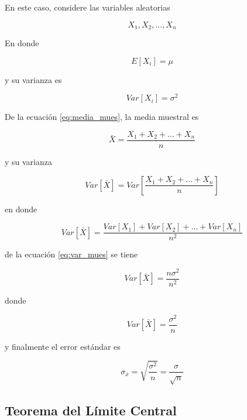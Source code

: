 \documentclass[
  oneside]{book}
\begin{document}
En este caso, considere las variables aleatorias

\begin{equation}
X_1,X_2,...,X_n
\label{eq:va}
\end{equation}

En donde

\begin{equation}
E[X_i]=\mu
\label{eq:esp}
\end{equation}

y su varianza es

\begin{equation}
Var[X_i]=\sigma^2
\label{eq:var}
\end{equation}

De la ecuación \eqref{eq:media_mues}, la media muestral es

\begin{equation}
\bar{X}=\frac{X_1+X_2+\dots+X_n}{n}
\label{eq:media_va}
\end{equation}

y su varianza

\begin{equation}
Var[\bar{X}]=Var\left[\frac{X_1+X_2+\dots+X_n}{n}\right]
\label{eq:var_mues}
\end{equation}

en donde

\begin{equation}
Var[\bar{X}]=\frac{Var[X_1]+Var[X_2]+\dots+Var[X_n]}{n^2}
\label{eq:var_mues2}
\end{equation}

de la ecuación \eqref{eq:var_mues} se tiene

\begin{equation}
Var[\bar{X}]=\frac{n\sigma^2}{n^2}
\end{equation}

donde

\begin{equation}
Var[\bar{X}]=\frac{\sigma^2}{n}
\end{equation}

y finalmente el error estándar es

\begin{equation}
\sigma_{\bar{x}}=\sqrt{\frac{\sigma^2}{n}}=\frac{\sigma}{\sqrt{n}}
\end{equation}

\subsection{Teorema del Límite Central}\label{teorema-del-luxedmite-central}
\end{document}
